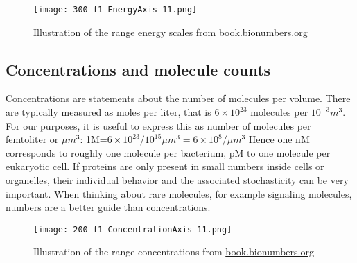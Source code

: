 \begin{figure}[t]
	\centering
	\texttt{[image: 300-f1-EnergyAxis-11.png]}
	\caption{Illustration of the range energy scales from \href{http://book.bionumbers.org/size-and-geometry-introduction/}{book.bionumbers.org}}
	\label{fig:genome_sizes}
\end{figure}


\subsection{Concentrations and molecule counts}
Concentrations are statements about the number of molecules per volume.
There are typically measured as moles per liter, that is $6\times 10^{23}$ molecules per $10^{-3}m^{3}$.
For our purposes, it is useful to express this as number of molecules per femtoliter or $\mu m^3$: 1M=$6\times 10^{23}/10^{15}\mu m^3 = 6\times 10^{8}/\mu m^3$
Hence one nM corresponds to roughly one molecule per bacterium, pM to one molecule per eukaryotic cell.
If proteins are only present in small numbers inside cells or organelles, their individual behavior and the associated stochasticity can be very important.
When thinking about rare molecules, for example signaling molecules, numbers are a better guide than concentrations.

\begin{figure}[h]
	\centering
	\texttt{[image: 200-f1-ConcentrationAxis-11.png]}
	\caption{Illustration of the range concentrations from \href{http://book.bionumbers.org/size-and-geometry-introduction/}{book.bionumbers.org}}
	\label{fig:genome_sizes}
\end{figure}


